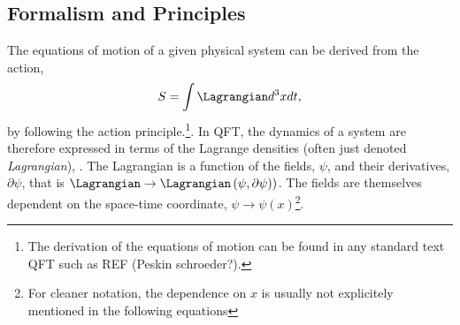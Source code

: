 \subsection{Formalism and Principles}
\label{subsec:formalism}

The equations of motion of a given physical system can be derived from the action,
\begin{equation}
  \label{eq:action}
  S = \int \Lagrangian d^3x dt,
\end{equation}
by following the action principle.\footnote{The derivation of the equations of motion can be found in any standard text QFT such as REF (Peskin schroeder?).}.
In QFT, the dynamics of a system are therefore expressed in terms of the Lagrange densities (often just denoted \emph{Lagrangian}), \Lagrangian. 
The Lagrangian is a function of the fields, $\psi$, and their derivatives, $\partial \psi$, that is $\Lagrangian \rightarrow \Lagrangian\left(\psi, \partial\psi)\right)$. The fields are themselves dependent on the space-time coordinate, $\psi \rightarrow \psi(x)$\footnote{For cleaner notation, the dependence on $x$ is usually not explicitely mentioned in the following equations}. 

